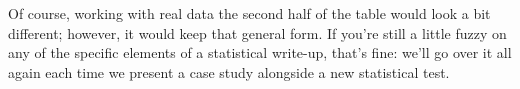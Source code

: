 Of course, working with real data the second half of the table would look a bit different; however, it would keep that general form. If you're still a little fuzzy on any of the specific elements of a statistical write-up, that's fine: we'll go over it all again each time we present a case study alongside a new statistical test.
